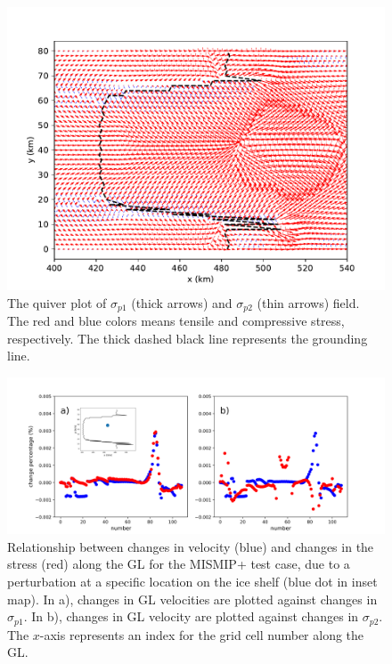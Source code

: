\documentclass[tc, manuscript]{copernicus}
\begin{document}
\begin{figure}
	\centering
	\includegraphics[width=1\linewidth]{figs/principal_stress_quiver.pdf}
	\caption{The quiver plot of $\sigma_{p1}$ (thick arrows) and $\sigma_{p2}$ (thin arrows) field. The red and blue colors means tensile and compressive stress, respectively. The thick dashed black line represents the grounding line.}
	\label{principal_stress_quiver}
\end{figure}

\begin{figure}
 	\centering
     \includegraphics[width=1\linewidth]{figs/vel_stress_change_example.pdf}
     \caption{Relationship between changes in velocity (blue) and changes in the stress (red) along the GL for the MISMIP+ test case, due to a perturbation at a specific location on the ice shelf (blue dot in inset map). In a), changes in GL velocities are plotted against changes in $\sigma_{p1}$. In b), changes in GL velocity are plotted against changes in $\sigma_{p2}$. The $x$-axis represents an index for the grid cell number along the GL.}
 	\label{vel_stress_change_example}
\end{figure}
\end{document}
